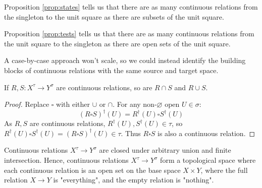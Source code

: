 \newthought{$\bullet \rightarrow \blacksquare$:} Proposition \ref{prop:states} tells us that there are as many continuous relations from the singleton to the unit square as there are subsets of the unit square.

\newthought{$\blacksquare \rightarrow \bullet$:} Proposition \ref{prop:tests} tells us that there are as many continuous relations from the unit square to the singleton as there are open sets of the unit square.

 A case-by-case approach won't scale, so we could instead identify the building blocks of continuous relations with the same source and target space.


\begin{proposition}\label{prop:framehom}
If $R,S: X^\tau \rightarrow Y^\sigma$ are continuous relations, so are $R \cap S$ and $R \cup S$.
\begin{proof}
Replace $\square$ with either $\cup$ or $\cap$. For any non-$\varnothing$ open $U \in \sigma$: \[(R \square S)^\dag (U) = R^\dag(U) \square S^\dag(U)\] As $R,S$ are continuous relations, $R^\dag(U),S^\dag(U) \in \tau$, so $R^\dag(U) \square S^\dag(U) = (R \square S)^\dag (U) \in \tau$. Thus $R\square S$ is also a continuous relation.
\end{proof}
\end{proposition}

\begin{corollary}\label{cor:homspace}
Continuous relations $X^\tau \rightarrow Y^\sigma$ are closed under arbitrary union and finite intersection. Hence, continuous relations $X^\tau \rightarrow Y^\sigma$ form a topological space where each continuous relation is an open set on the base space $X \times Y$, where the full relation $X \rightarrow Y$ is "everything", and the empty relation is "nothing".
\end{corollary}


